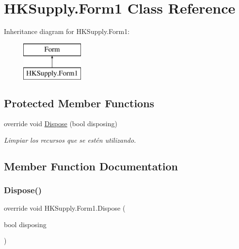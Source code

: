 \hypertarget{class_h_k_supply_1_1_form1}{}\section{H\+K\+Supply.\+Form1 Class Reference}
\label{class_h_k_supply_1_1_form1}
Inheritance diagram for H\+K\+Supply.\+Form1\+:\begin{figure}[H]
\begin{center}
\leavevmode
\includegraphics[height=2.000000cm]{class_h_k_supply_1_1_form1}
\end{center}
\end{figure}
\subsection*{Protected Member Functions}
\begin{DoxyCompactItemize}
\item 
override void \mbox{\hyperlink{class_h_k_supply_1_1_form1_a406b8a9257d093c285ba546b75e81757}{Dispose}} (bool disposing)
\begin{DoxyCompactList}\small\item\em Limpiar los recursos que se estén utilizando. \end{DoxyCompactList}\end{DoxyCompactItemize}


\subsection{Member Function Documentation}
\mbox{\label{class_h_k_supply_1_1_form1_a406b8a9257d093c285ba546b75e81757}} 
\subsubsection{\texorpdfstring{Dispose()}{Dispose()}}
{\footnotesize\ttfamily override void H\+K\+Supply.\+Form1.\+Dispose (\begin{DoxyParamCaption}\item[{bool}]{disposing }\end{DoxyParamCaption})\hspace{0.3cm}{\ttfamily [protected]}}



